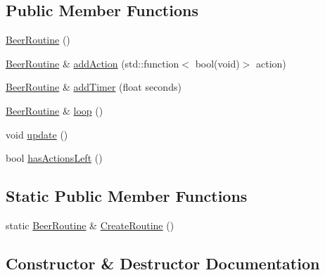 \subsection*{Public Member Functions}
\begin{DoxyCompactItemize}
\item 
\mbox{\hyperlink{class_beer_engine_1_1_beer_routine_1_1_beer_routine_ad3cedf2bbe2719e1a8b951f16a416ca9}{Beer\+Routine}} ()
\item 
\mbox{\hyperlink{class_beer_engine_1_1_beer_routine_1_1_beer_routine}{Beer\+Routine}} \& \mbox{\hyperlink{class_beer_engine_1_1_beer_routine_1_1_beer_routine_abd6b5782ae6bc5f951d4df91f700fdc3}{add\+Action}} (std\+::function$<$ bool(void)$>$ action)
\item 
\mbox{\hyperlink{class_beer_engine_1_1_beer_routine_1_1_beer_routine}{Beer\+Routine}} \& \mbox{\hyperlink{class_beer_engine_1_1_beer_routine_1_1_beer_routine_a174692c444eca2b7e6ba55389bc73f0b}{add\+Timer}} (float seconds)
\item 
\mbox{\hyperlink{class_beer_engine_1_1_beer_routine_1_1_beer_routine}{Beer\+Routine}} \& \mbox{\hyperlink{class_beer_engine_1_1_beer_routine_1_1_beer_routine_a2e521613bf057c806b73a2b0855f7a1f}{loop}} ()
\item 
void \mbox{\hyperlink{class_beer_engine_1_1_beer_routine_1_1_beer_routine_af210700097e82efb5c60ef68c73cb900}{update}} ()
\item 
bool \mbox{\hyperlink{class_beer_engine_1_1_beer_routine_1_1_beer_routine_ac165279d864e7ba3fafb758ea070ce7b}{has\+Actions\+Left}} ()
\end{DoxyCompactItemize}
\subsection*{Static Public Member Functions}
\begin{DoxyCompactItemize}
\item 
static \mbox{\hyperlink{class_beer_engine_1_1_beer_routine_1_1_beer_routine}{Beer\+Routine}} \& \mbox{\hyperlink{class_beer_engine_1_1_beer_routine_1_1_beer_routine_a07e9e9623fbdf1899b2fd1d163eca54a}{Create\+Routine}} ()
\end{DoxyCompactItemize}


\subsection{Constructor \& Destructor Documentation}
\mbox{\label{class_beer_engine_1_1_beer_routine_1_1_beer_routine_ad3cedf2bbe2719e1a8b951f16a416ca9}} 
